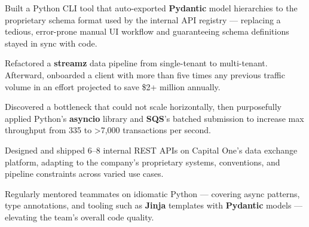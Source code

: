 
\expExtra{} %


\begin{rExperience}

  \item Built a Python CLI tool that auto-exported \textbf{Pydantic} model hierarchies to the proprietary schema format
    used by the internal API registry --- replacing a tedious, error-prone manual UI workflow and guaranteeing schema
    definitions stayed in sync with code.

  \item Refactored a \textbf{streamz} data pipeline from single-tenant to multi-tenant. Afterward, onboarded a client
    with more than five times any previous traffic volume in an effort projected to save \$2+ million annually.

  \item Discovered a bottleneck that could not scale horizontally, then purposefully applied Python's \textbf{asyncio}
    library and \textbf{SQS}'s batched submission to increase max throughput from 335 to >7,000 transactions per second.

  \item Designed and shipped 6--8 internal REST APIs on Capital One's data exchange platform, adapting to the company's
    proprietary systems, conventions, and pipeline constraints across varied use cases.

  \item Regularly mentored teammates on idiomatic Python --- covering async patterns, type annotations, and tooling such
    as \textbf{Jinja} templates with \textbf{Pydantic} models --- elevating the team's overall code quality.


\end{rExperience}
